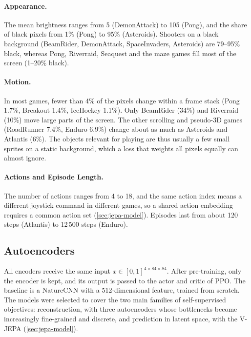 \documentclass[runningheads,a4paper]{llncs}
\begin{document}
\paragraph{Appearance.} The mean brightness ranges from 5 (DemonAttack) to 105 (Pong), and
the share of black pixels from 1\% (Pong) to 95\% (Asteroids). Shooters on a black background
(BeamRider, DemonAttack, SpaceInvaders, Asteroids) are 79--95\% black, whereas Pong, Riverraid,
Seaquest and the maze games fill most of the screen (1--20\% black).

\paragraph{Motion.} In most games, fewer than 4\% of the pixels change within a frame stack
(Pong 1.7\%, Breakout 1.4\%, IceHockey 1.1\%). Only BeamRider (34\%) and Riverraid (10\%) move
large parts of the screen. The other scrolling and pseudo-3D games (RoadRunner 7.4\%, Enduro
6.9\%) change about as much as Asteroids and Atlantis (6\%). The objects relevant for playing are thus usually a few small sprites on a static background,
which a loss that weights all pixels equally can almost ignore.

\paragraph{Actions and Episode Length.} The number of actions ranges from 4 to 18, and the same
action index means a different joystick command in different games, so a shared action
embedding requires a common action set (\cref{sec:jepa-model}). Episodes last from about
120 steps (Atlantis) to 12\,500 steps (Enduro).

\subsection{Autoencoders}
\label{sec:models}

All encoders receive the same input $x\in[0,1]^{4\times84\times84}$. After pre-training, only the encoder is kept, and its output is passed to the actor and critic
of PPO. The baseline is a NatureCNN with a 512-dimensional feature, trained
from scratch. The models were selected to cover the two main families of self-supervised
objectives: reconstruction, with three autoencoders whose bottlenecks become increasingly
fine-grained and discrete, and prediction in latent space, with the V-JEPA
(\cref{sec:jepa-model}).
\end{document}
